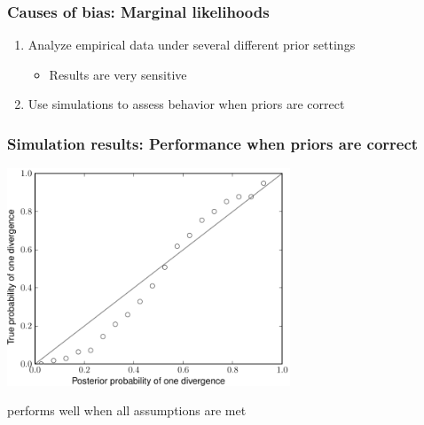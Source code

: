 \begin{frame}
    \frametitle{Causes of bias: Marginal likelihoods}
    \begin{enumerate}
        \item<3-> Analyze empirical data under several different prior settings
            \begin{itemize}
                \item<3-> Results are very sensitive
            \end{itemize}
        \item<4-> Use simulations to assess behavior when priors are correct
    \end{enumerate}
\end{frame}

\begin{frame}
    \frametitle{Simulation results: Performance when priors are correct}
    \begin{center}
        \includegraphics[height=6.5cm]{../images/validation-model-choice-old.pdf}

        \smallskip
        \msb performs well when all assumptions are met
    \end{center}
\end{frame}

